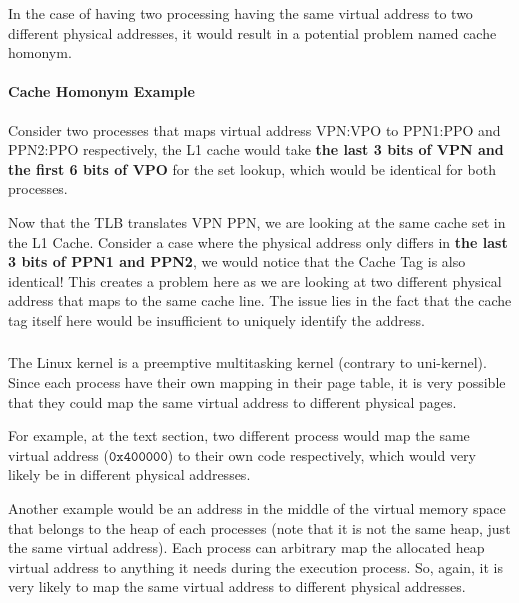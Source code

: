\documentclass[12pt]{article}
\begin{document}
In the case of having two processing having the same virtual address to two different physical addresses, it would result in a potential problem named cache homonym. 

\paragraph*{Cache Homonym Example}

Consider two processes that maps virtual address VPN:VPO to PPN1:PPO and PPN2:PPO respectively, the L1 cache would take \textbf{the last 3 bits of VPN and the first 6 bits of VPO} for the set lookup, which would be identical for both processes.

Now that the TLB translates VPN \textrightarrow{} PPN, we are looking at the same cache set in the L1 Cache. Consider a case where the physical address only differs in \textbf {the last 3 bits of PPN1 and PPN2}, we would notice that the Cache Tag is also identical! This creates a problem here as we are looking at two different physical address that maps to the same cache line. The issue lies in the fact that the cache tag itself here would be insufficient to uniquely identify the address.

\subsubsection{}

The Linux kernel is a preemptive multitasking kernel (contrary to uni-kernel). Since each process have their own mapping in their page table, it is very possible that they could map the same virtual address to different physical pages. 

For example, at the text section, two different process would map the same virtual address ($\mathtt{0x400000}$) to their own code respectively, which would very likely be in different physical addresses. 

Another example would be an address in the middle of the virtual memory space that belongs to the heap of each processes (note that it is not the same heap, just the same virtual address). Each process can arbitrary map the allocated heap virtual address to anything it needs during the execution process. So, again, it is very likely to map the same virtual address to different physical addresses.

\subsection{}
\end{document}
